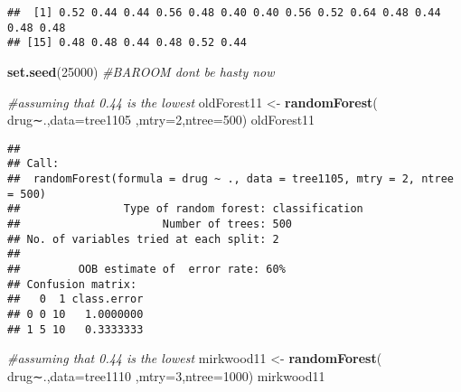 \documentclass[]{article}
\newenvironment{Shaded}{\begin{snugshade}}{\end{snugshade}}
\newcommand{\KeywordTok}[1]{\textcolor[rgb]{0.13,0.29,0.53}{\textbf{#1}}}
\newcommand{\DataTypeTok}[1]{\textcolor[rgb]{0.13,0.29,0.53}{#1}}
\newcommand{\DecValTok}[1]{\textcolor[rgb]{0.00,0.00,0.81}{#1}}
\newcommand{\StringTok}[1]{\textcolor[rgb]{0.31,0.60,0.02}{#1}}
\newcommand{\CommentTok}[1]{\textcolor[rgb]{0.56,0.35,0.01}{\textit{#1}}}
\newcommand{\ControlFlowTok}[1]{\textcolor[rgb]{0.13,0.29,0.53}{\textbf{#1}}}
\newcommand{\OperatorTok}[1]{\textcolor[rgb]{0.81,0.36,0.00}{\textbf{#1}}}
\newcommand{\NormalTok}[1]{#1}
\begin{document}
\begin{Shaded}
\end{Shaded}

\begin{verbatim}
##  [1] 0.52 0.44 0.44 0.56 0.48 0.40 0.40 0.56 0.52 0.64 0.48 0.44 0.48 0.48
## [15] 0.48 0.48 0.44 0.48 0.52 0.44
\end{verbatim}

\begin{Shaded}
\begin{Highlighting}[]
\KeywordTok{set.seed}\NormalTok{(}\DecValTok{25000}\NormalTok{)}
\CommentTok{#BAROOM dont be hasty now}

\CommentTok{#assuming that 0.44 is the lowest}
\NormalTok{oldForest11 <-}\StringTok{ }\KeywordTok{randomForest}\NormalTok{( drug∼.,}\DataTypeTok{data=}\NormalTok{tree1105  ,}\DataTypeTok{mtry=}\DecValTok{2}\NormalTok{,}\DataTypeTok{ntree=}\DecValTok{500}\NormalTok{)}
\NormalTok{oldForest11}
\end{Highlighting}
\end{Shaded}

\begin{verbatim}
## 
## Call:
##  randomForest(formula = drug ~ ., data = tree1105, mtry = 2, ntree = 500) 
##                Type of random forest: classification
##                      Number of trees: 500
## No. of variables tried at each split: 2
## 
##         OOB estimate of  error rate: 60%
## Confusion matrix:
##   0  1 class.error
## 0 0 10   1.0000000
## 1 5 10   0.3333333
\end{verbatim}

\begin{Shaded}
\begin{Highlighting}[]
\CommentTok{#assuming that 0.44 is the lowest}
\NormalTok{mirkwood11 <-}\StringTok{ }\KeywordTok{randomForest}\NormalTok{( drug∼.,}\DataTypeTok{data=}\NormalTok{tree1110  ,}\DataTypeTok{mtry=}\DecValTok{3}\NormalTok{,}\DataTypeTok{ntree=}\DecValTok{1000}\NormalTok{)}
\NormalTok{mirkwood11}
\end{Highlighting}
\end{Shaded}
\end{document}
